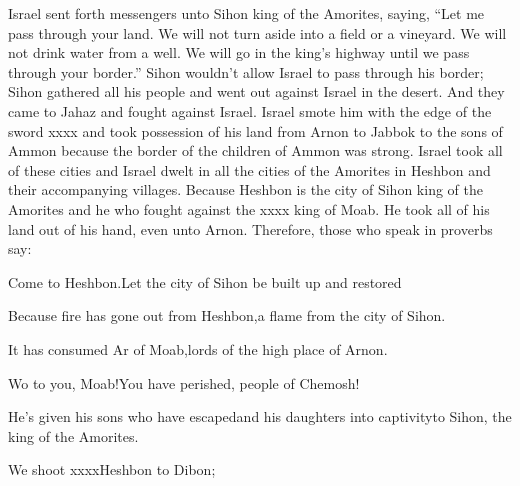 \begin{inparaenum}
   Israel sent forth messengers unto Sihon king of the Amorites, saying,%
   ``Let me pass through your land. We will not turn aside into a field or a vineyard. We will not drink water from a well. We will go in the king's highway until we pass through your border.''%
   Sihon wouldn't allow Israel to pass through his border; Sihon gathered all his people and went out against Israel in the desert. And they came to Jahaz and fought against Israel.%
   Israel smote him with the edge of the sword xxxx and took possession of his land from Arnon to Jabbok to the sons of Ammon because the border of the children of Ammon was strong.%
   Israel took all of these cities and Israel dwelt in all the cities of the Amorites in Heshbon and their accompanying villages.%
   Because Heshbon is the city of Sihon king of the Amorites and he who fought against the xxxx king of Moab. He took all of his land out of his hand, even unto Arnon.%
   Therefore, those who speak in proverbs say:\smallskip%
  
  \pb Come to Heshbon.\pa Let the city of Sihon be built up and restored%
  
  \pa {} Because fire has gone out from Heshbon,\pa a flame from the city of Sihon.%
  
  \pb It has consumed Ar%
  of Moab,\pa lords of the high place of Arnon.%
  
  \pa {} Wo to you, Moab!\pa You have perished, people of Chemosh!%
  
  \pb He's given his sons who have escaped\pa and his daughters into captivity\pa to Sihon, the king of the Amorites.%
  
  \pa {} We shoot xxxx\pa Heshbon to Dibon;%
  

\end{inparaenum}
